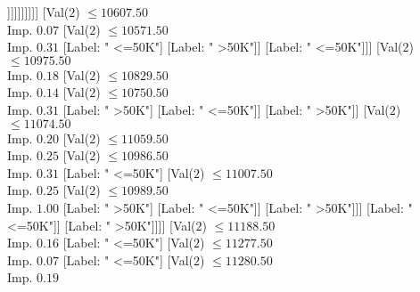 \documentclass[margin=10pt]{standalone}
\begin{document}
\begin{forest}
																															[Label: " >50K"]
																															[Val($2$) $ \leq 10099.50$ \\ Imp. $0.17$
																																[Label: " <=50K"]
																																[Val($2$) $ \leq 10161.50$ \\ Imp. $0.31$
																																	[Label: " >50K"]
																																	[Val($2$) $ \leq 10279.50$ \\ Imp. $0.46$
																																		[Label: " <=50K"]
																																		[Label: " >50K"]]]]]]]]]]
																									[Val($2$) $ \leq 10607.50$ \\ Imp. $0.07$
																										[Val($2$) $ \leq 10571.50$ \\ Imp. $0.31$
																											[Label: " <=50K"]
																											[Label: " >50K"]]
																										[Label: " <=50K"]]]
																								[Val($2$) $ \leq 10975.50$ \\ Imp. $0.18$
																									[Val($2$) $ \leq 10829.50$ \\ Imp. $0.14$
																										[Val($2$) $ \leq 10750.50$ \\ Imp. $0.31$
																											[Label: " >50K"]
																											[Label: " <=50K"]]
																										[Label: " >50K"]]
																									[Val($2$) $ \leq 11074.50$ \\ Imp. $0.20$
																										[Val($2$) $ \leq 11059.50$ \\ Imp. $0.25$
																											[Val($2$) $ \leq 10986.50$ \\ Imp. $0.31$
																												[Label: " <=50K"]
																												[Val($2$) $ \leq 11007.50$ \\ Imp. $0.25$
																													[Val($2$) $ \leq 10989.50$ \\ Imp. $1.00$
																														[Label: " >50K"]
																														[Label: " <=50K"]]
																													[Label: " >50K"]]]
																											[Label: " <=50K"]]
																										[Label: " >50K"]]]]
																							[Val($2$) $ \leq 11188.50$ \\ Imp. $0.16$
																								[Label: " <=50K"]
																								[Val($2$) $ \leq 11277.50$ \\ Imp. $0.07$
																									[Label: " <=50K"]
																									[Val($2$) $ \leq 11280.50$ \\ Imp. $0.19$

\end{forest}
\end{document}
